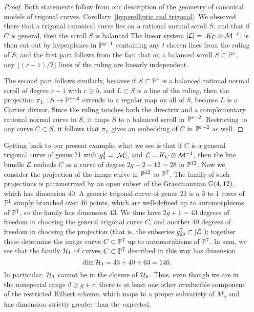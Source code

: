 \begin{proof}
Both statements follow from our description of the geometry of canonical models of trigonal curves, Corollary~\ref{hyperelliptic and trigonal}. We observed there that a trigonal canonical curve lies on a rational normal scroll $S$, and that if $C$ is general, then the scroll $S$ is balanced %
The linear system $|\cL| = | K_C \otimes \cM^{-l}|$ is then cut out by hyperplanes in $\PP^{g-1}$ containing  any $l$ chosen lines from the ruling of $S$; and the first part follows from the fact that on a balanced scroll $S \subset \PP^r$, any $\lfloor (r+1)/2\rfloor$ lines of the ruling are linearly independent.

The second part follows similarly, because if $S \subset \PP^r$ is a balanced rational normal scroll of degree $r-1$ with $r\geq 5$, and $L \subset S$ is a line of the ruling, then the projection $\pi_L : S \to \PP^{r-2}$ extends to a regular map on all of $S$, because $L$
is a Cartier divisor. Since the ruling touches both the directrix and a complementary rational normal curve in $S$, it maps $S$ to a balanced scroll in $\PP^{r-2}$. Restricting to any curve $C \subset S$, it follows that $\pi_L$ gives an embedding of $C$ in $\PP^{r-2}$ as well.
\end{proof}

Getting back to our present example, what we see is that if $C$ is a general trigonal curve of genus 21 with $g^1_3 = |\cM|$, and $\cL = K_C \otimes \cM^{-4}$, then the line bundle $\cL$ embeds $C$ as a curve of degree $2g-2-12 = 28$ in $\PP^{12}$. Now we consider the projection of the image curve in $\PP^{12}$ to $\PP^7$. The  family of such projections is parametrized by an open subset of the Grassmannian $\GG(4, 12)$, which has dimension 40. A generic trigonal curve of genus 21 is a 3 to 1 cover of
$\PP^1$ simply branched over 46 points, which are well-defined up to automorphisms of $\PP^1$, so the family has dimension 43. We thus have $2g+1 = 43$ degrees of freedom in choosing the general trigonal curve $C$, and 
another 40 degrees of freedom in choosing the projection (that is, the subseries $g^7_{28} \subset |\cL|$); together these determine the image curve $C \subset \PP^7$ up to automorphisms of $\PP^7$. In sum, we see that the family $\cH_1$ of curves $C \subset \PP^7$ described in this way has dimension
$$
\dim \cH_1 = 43 + 40 + 63 = 146.
$$
In particular, $\cH_1$ cannot be in the closure of $\cH_0$. Thus, even though we are in the nonspecial range $d \geq g+r$, there is at least one other irreducible component of the restricted Hilbert scheme, which maps to a proper subvariety of $M_g$ and has dimension strictly greater than the expected.



